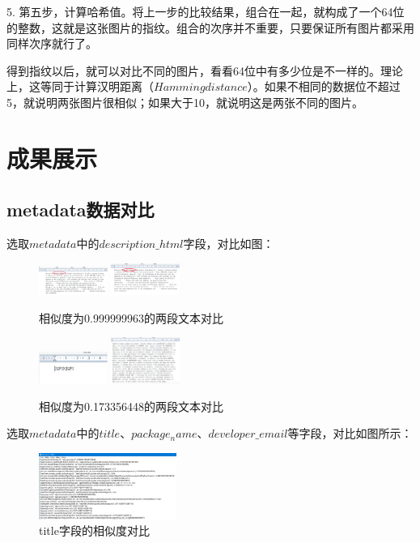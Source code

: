 \documentclass[UTF8,a4paper,10pt, twocolumn]{ctexart}
\begin{document}
5. 第五步，计算哈希值。将上一步的比较结果，组合在一起，就构成了一个64位的整数，这就是这张图片的指纹。组合的次序并不重要，只要保证所有图片都采用同样次序就行了。

得到指纹以后，就可以对比不同的图片，看看64位中有多少位是不一样的。理论上，这等同于计算汉明距离（$Hamming distance$）。如果不相同的数据位不超过5，就说明两张图片很相似；如果大于10，就说明这是两张不同的图片。

\section{成果展示}
\subsection{metadata数据对比}
选取$metadata$中的$description\_html$字段，对比如图：

\begin{figure}[htbp]
\centering
\includegraphics[width=0.2\textwidth]{img/fig1.png}
\includegraphics[width=0.2\textwidth]{img/fig2.png}
\caption{相似度为0.999999963的两段文本对比}
\label{figure:zju1}
\end{figure}

\begin{figure}[htbp]
  \centering
  \includegraphics[width=0.2\textwidth]{img/fig3.png}
  \includegraphics[width=0.2\textwidth]{img/fig4.png}
  \caption{相似度为0.173356448的两段文本对比}
  \label{figure:zju2}
  \end{figure}

选取$metadata$中的$title$、$package_name$、$developer\_email$等字段，对比如图所示：

\begin{figure}[htbp]
  \centering
  \includegraphics[width=0.4\textwidth]{img/fig5.png}
  \caption{title字段的相似度对比}
  \label{figure:zju3}
  \end{figure}
\end{document}
